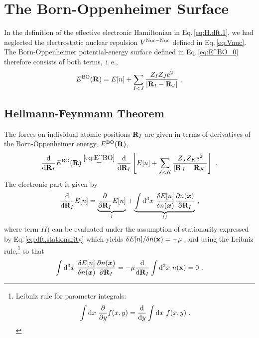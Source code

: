 \newpage

\section{The Born-Oppenheimer Surface}
In the definition of the effective electronic Hamiltonian in Eq.\,\eqref{eq:H.dft.1}, we had neglected the electrostatic nuclear repulsion $V^{\rm Nuc-Nuc}$ defined in Eq.\,\eqref{eq:Vnuc}. The Born-Oppenheimer potential-energy surface defined in Eq.\,\eqref{eq:E^BO_0} therefore consists of both terms,~i.\,e.,
\begin{align}
	E^{\rm BO} ({\bf R}) 
		= E[n] + \sum_{I < J} \frac{Z_{I} Z_{J} e^{2}}{\left|{\bf R}_{I}-{\bf R}_{J}\right|}~.
	\label{eq:E^BO}
\end{align}

\subsection{Hellmann-Feynmann Theorem}
\label{sec:HellmannFeynman}
The forces on individual atomic positions ${\bf R}_I$ are given in terms of derivatives of the Born-Oppenheimer energy, $E^{\rm BO} ({\bf R})$,
\begin{align}
	\frac{\d}{\d {\bf R}_I} E^{\rm BO} ({\bf R})
		\stackrel{\eqref{eq:E^BO}}{=}
			\frac{\d}{\d {\bf R}_I } \left[
				E[n] + \sum_{J < K} \frac{Z_{J} Z_{K} e^{2}}{\left|{\b R}_{J}-{\bf R}_{K}\right|}
			\right]
			~.
	\label{eq:hellmannfeynman.1}
\end{align}
The electronic part is given by
\begin{align}
		\frac{\d}{\d {\bf R}_I} E[n]
			= 
				\underset{I}{\underbrace{\frac{\partial}{\partial {\bf R}_I} E[n]}}
			+ \underset{II}{\underbrace{
					\int \d^{3} x ~ \frac{\delta E[n]}{\delta n(\boldsymbol{x})} \frac{\partial n(\boldsymbol{x})}{\partial {\bf R}_{I}}
				}}~,
		\label{eq:hellmannfeynman.2}
\end{align}
where term $II)$ can be evaluated under the assumption of stationarity expressed by Eq.\,\eqref{eq:dft.stationarity} which yields 
\mbox{$\delta E[n] / \delta n({\bf x}) = -\mu$},
and using the Leibniz rule,\footnote{Leibniz rule for parameter integrals:
	\begin{align*}
		\int {\rm d} x ~ \frac{\partial}{\partial y} f(x, y) 
			= \frac{{\rm d}}{{\rm d} y} \int {\rm d} x ~ f(x, y)~.
	\end{align*}
} so that
\begin{align}
	\int \d^{3} x ~ \frac{\delta E[n]}{\delta n(\boldsymbol{x})} \frac{\partial n(\boldsymbol{x})}{\partial {\bf R}_{I}}
	= -\mu \frac{\d}{\d {\bf R}_I} \int \d^{3} x ~ n ({\bf x})
	= 0~.
	\label{eq:hellmannfeynman.3}
\end{align}
